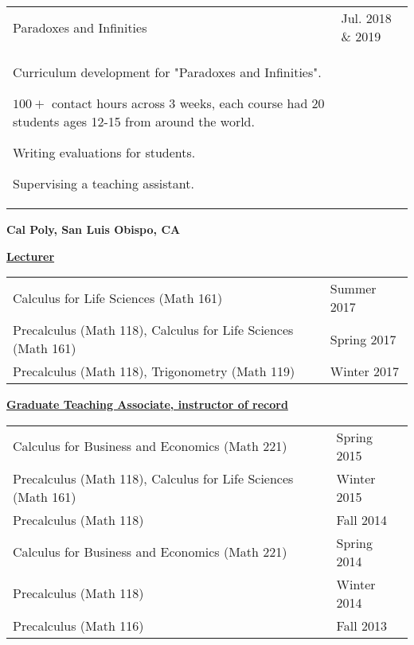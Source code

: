 \documentclass[margin,line]{res}
\newenvironment{list1}{
  \begin{list}{\ding{113}}{%
      \setlength{\itemsep}{0in}
      \setlength{\parsep}{0in} \setlength{\parskip}{0in}
      \setlength{\topsep}{0in} \setlength{\partopsep}{0in}
      \setlength{\leftmargin}{0.17in}}}{\end{list}}
\renewcommand{\subsection}[1]{%
      \par\vspace{3pt}%
      \underline{\normalsize\bfseries #1}%
      \par\vspace{3pt}%
    }
\begin{document}
\begin{resume}
\begin{tabular}{@{}p{4in}p{1.5in}}
    Paradoxes and Infinities & Jul. 2018 \& 2019\\
    \begin{list1}
      \item Curriculum development for "Paradoxes and Infinities".
      \item $100+$ contact hours across 3 weeks, each course had 20 students ages 12-15 from around the world.
      \item Writing evaluations for students.
      \item Supervising a teaching assistant.
  \end{list1}
\end{tabular}


\vspace{.5cm}
{\bf Cal Poly, San Luis Obispo, CA}
\subsection{\sc Lecturer}
\begin{tabular}{@{}p{4in}p{1.0in}}
Calculus for Life Sciences (Math 161) & \multirow{1}{1in}{Summer 2017}\\
Precalculus (Math 118), Calculus for Life Sciences (Math 161) & \multirow{1}{1in}{Spring 2017}\\
Precalculus (Math 118), Trigonometry (Math 119) & \multirow{1}{1in}{Winter 2017}\\
\end{tabular}

\subsection{\sc Graduate Teaching Associate, instructor of record}
\begin{tabular}{@{}p{4in}p{1.0in}}
  Calculus for Business and Economics (Math 221) & \multirow{1}{1in}{Spring 2015}\\
  Precalculus (Math 118), Calculus for Life Sciences (Math 161) & \multirow{1}{1in}{Winter 2015}\\
  Precalculus (Math 118) & \multirow{1}{1in}{Fall 2014}\\
  Calculus for Business and Economics (Math 221) & \multirow{1}{1in}{Spring 2014}\\
  Precalculus (Math 118) & \multirow{1}{1in}{Winter 2014}\\
  Precalculus (Math 116) & \multirow{1}{1in}{Fall 2013}\\
\end{tabular}

\end{resume}
\end{document}
